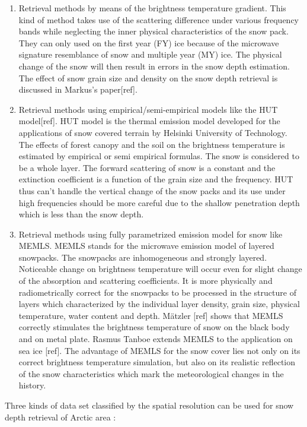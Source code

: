 \begin{enumerate}
\item Retrieval methods by means of the brightness temperature gradient. This kind of method takes use of the scattering difference under various frequency bands while neglecting the inner physical characteristics of the snow pack. They can only used on the first year (FY) ice because of the microwave signature resemblance of snow and multiple year (MY) ice. The physical change of the snow will then result in errors in the snow depth estimation. The effect of snow grain size and density on the snow depth retrieval is discussed in Markus's paper[ref].
\item Retrieval methods using empirical/semi-empirical models like the HUT model[ref]. HUT model is the thermal emission model developed for the applications of snow covered terrain by Helsinki University of Technology. The effects of forest canopy and the soil on the brightness temperature is estimated by empirical or semi empirical formulas. The snow is considered to be a whole layer. The forward scattering of snow is a constant and the extinction coefficient is a function of the grain size and the frequency. HUT thus can't handle the vertical change of the snow packs and its use under high frequencies should be more careful due to the shallow penetration depth which is less than the snow depth.    
\item Retrieval methods using fully parametrized emission model for snow like MEMLS. MEMLS stands for the microwave emission model of layered snowpacks. The snowpacks are inhomogeneous and strongly layered. Noticeable change on brightness temperature will occur even for slight change of the absorption and scattering coefficients. It is more physically and radiometrically correct for the snowpacks to be processed in the structure of layers which characterized by the individual layer density, grain size, physical temperature, water content and depth. Mätzler [ref] shows that MEMLS correctly stimulates the brightness temperature of snow on the black body and on metal plate. Rasmus Tanboe extends MEMLS to the application on sea ice [ref]. The advantage of MEMLS for the snow cover lies not only on its correct brightness temperature simulation, but also on its realistic reflection of the snow characteristics which mark the meteorological changes in the history.   
\end{enumerate}
Three kinds of data set classified by the spatial resolution can be used for snow depth retrieval of Arctic area :
